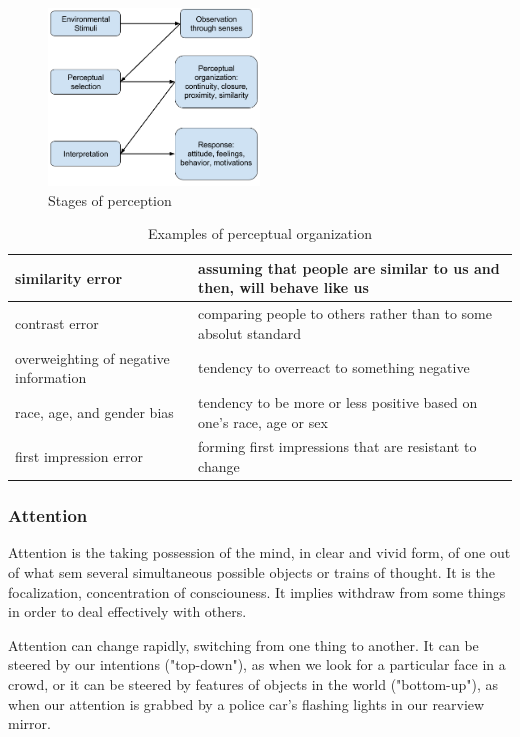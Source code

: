 \documentclass[12pt,article,oneside,a4paper]{memoir}
\begin{document}
\begin{figure}
  \centering
  \includegraphics[width=0.5\textwidth]{imgs/perception-stages.png}
  \caption{Stages of perception}
  \label{fig:perception-stages}
\end{figure}

\begin{table}
  \begin{tabular}{ p{5cm} |  p{10cm} }
    \hline
    similarity error & assuming that people are similar to us and then, will behave like us \\ \hline
    contrast error & comparing people to others rather than to some absolut standard \\ \hline
    overweighting of negative information & tendency to overreact to something negative \\ \hline
    race, age, and gender bias & tendency to be more or less positive based on one's race, age or sex \\ \hline
	first impression error & forming first impressions that are resistant to change \\ 
    \hline
  \end{tabular}
  \caption{Examples of perceptual organization}
  \label{table:accuracy-judgment}
\end{table}

\subsubsection{Attention}
Attention is the taking possession of the mind, in clear and vivid form, of one out of what sem several simultaneous possible objects or trains of thought. It is the focalization, concentration of consciouness. It implies withdraw from some things in order to deal effectively with others.

Attention can change rapidly, switching from one thing to another. It can be steered by our intentions ("top-down"), as when we look for a particular face in a crowd, or it
can be steered by features of objects in the world ("bottom-up"), as when our attention is grabbed by a police car's flashing lights in our rearview mirror.
\end{document}
